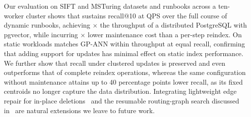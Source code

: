 \documentclass[sigconf,review,anonymous]{acmart}
\begin{document}
Our evaluation on SIFT and MSTuring datasets and runbooks across a ten-worker cluster shows that \SystemName{} sustains  recall@10 at  QPS over the full course of dynamic runbooks, achieving $\times$ the throughput of a distributed PostgreSQL with pgvector, while incurring $\times$ lower maintenance cost than a per-step reindex. On static workloads \SystemName{} matches GP-ANN within  throughput at equal recall, confirming that adding support for updates has minimal effect on static index performance. We further show that recall under clustered updates is preserved and even outperforms that of complete reindex operations, whereas the same configuration without maintenance attains up to 40 percentage points lower recall, as its fixed centroids no longer capture the data distribution. Integrating lightweight edge repair for in-place deletions~\cite{yu2025topology, xiao2024enhancing, xu2025place} and the resumable routing-graph search discussed in~\cite{lu2026depth} are natural extensions we leave to future work.

\begin{acks}

\end{acks}





\appendix


\end{document}
